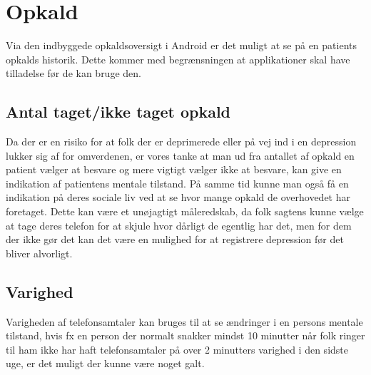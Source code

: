 \section{Opkald}
Via den indbyggede opkaldsoversigt i Android er det muligt at se på en patients opkalds historik. Dette kommer med begrænsningen at applikationer skal have tilladelse før de kan bruge den.

\subsection{Antal taget/ikke taget opkald}
Da der er en risiko for at folk der er deprimerede eller på vej ind i en depression lukker sig af for omverdenen, er vores tanke at man ud fra antallet af opkald en patient vælger at besvare og mere vigtigt vælger ikke at besvare, kan give en indikation af patientens mentale tilstand. På samme tid kunne man også få en indikation på deres sociale liv ved at se hvor mange opkald de overhovedet har foretaget.
Dette kan være et unøjagtigt måleredskab, da folk sagtens kunne vælge at tage deres telefon for at skjule hvor dårligt de egentlig har det, men for dem der ikke gør det kan det være en mulighed for at registrere depression før det bliver alvorligt.

\subsection{Varighed}
Varigheden af telefonsamtaler kan bruges til at se ændringer i en persons mentale tilstand, hvis fx en person der normalt snakker mindst 10 minutter når folk ringer til ham ikke har haft telefonsamtaler på over 2 minutters varighed i den sidste uge, er det muligt der kunne være noget galt.

